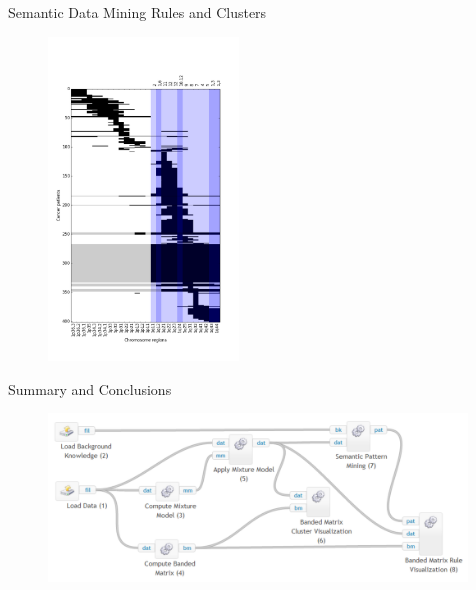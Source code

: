 \documentclass[first=dgreen,second=purple,logo=redexc]{aaltoslides}
\begin{document}
\begin{frame} {Semantic Data Mining Rules and Clusters} 

      \begin{figure}
      \centering
      \includegraphics[trim=0cm 1.5cm 0cm 2cm, clip=true, width=0.45\textwidth]{figures/rules.png}
      \end{figure}
      

\end{frame}



\begin{frame}{Summary and Conclusions}

  \begin{figure}
      \centering
      \includegraphics[trim=1cm 0cm 0cm 0cm, clip=true, width=0.99\textwidth]{figures/workflow}
      \end{figure}
      
\end{frame}
\end{document}
